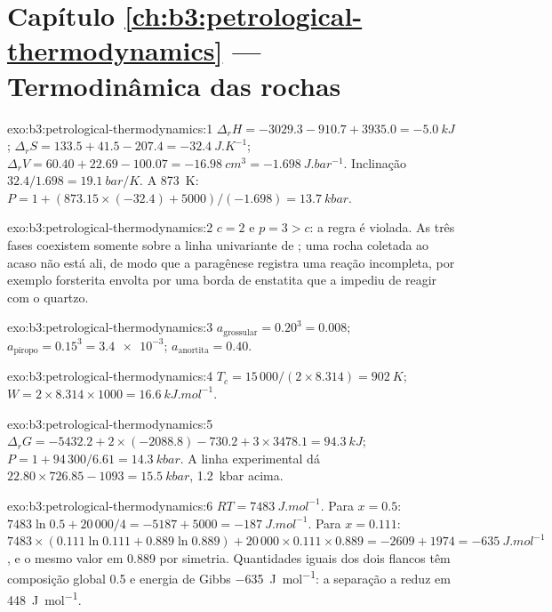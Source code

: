 \section*{Capítulo \ref{ch:b3:petrological-thermodynamics} --- Termodinâmica das rochas}

\begin{solution}{exo:b3:petrological-thermodynamics:1}
$\Delta_rH = -3029.3 - 910.7 + 3935.0 = \qty{-5.0}{kJ}$; $\Delta_rS = 133.5 +
41.5 - 207.4 = \qty{-32.4}{J.K^{-1}}$; $\Delta_rV = 60.40 + 22.69 - 100.07 =
\qty{-16.98}{cm^3} = \qty{-1.698}{J.bar^{-1}}$. Inclinação $32.4/1.698 =
\qty{19.1}{bar/K}$. A \qty{873}{K}: $P = 1 + (873.15\times(-32.4) +
5000)/(-1.698) = \qty{13.7}{kbar}$.
\end{solution}

\begin{solution}{exo:b3:petrological-thermodynamics:2}
$c = 2$ e $p = 3 > c$: a regra é violada. As três fases coexistem somente sobre a
linha univariante de ; uma rocha coletada ao
acaso não está ali, de modo que a paragênese registra uma reação incompleta,
por exemplo forsterita envolta por uma borda de enstatita que a impediu de
reagir com o quartzo.
\end{solution}

\begin{solution}{exo:b3:petrological-thermodynamics:3}
$a_{\text{grossular}} = 0.20^3 = 0.008$; $a_{\text{piropo}} = 0.15^3 =
\num{3.4e-3}$; $a_{\text{anortita}} = 0.40$.
\end{solution}

\begin{solution}{exo:b3:petrological-thermodynamics:4}
$T_c = 15\,000/(2\times8.314) = \qty{902}{K}$; $W = 2\times8.314\times1000
= \qty{16.6}{kJ.mol^{-1}}$.
\end{solution}

\begin{solution}{exo:b3:petrological-thermodynamics:5}
$\Delta_rG = -5432.2 + 2\times(-2088.8) - 730.2 + 3\times3478.1 =
\qty{94.3}{kJ}$; $P = 1 + 94\,300/6.61 = \qty{14.3}{kbar}$. A linha
experimental dá $22.80\times726.85 - 1093 = \qty{15.5}{kbar}$, \qty{1.2}{kbar}
acima.
\end{solution}

\begin{solution}{exo:b3:petrological-thermodynamics:6}
$RT = \qty{7483}{J.mol^{-1}}$. Para $x = 0.5$: $7483\ln0.5 + 20\,000/4 = -5187 +
5000 = \qty{-187}{J.mol^{-1}}$. Para $x = 0.111$: $7483\times(0.111\ln0.111 +
0.889\ln0.889) + 20\,000\times0.111\times0.889 = -2609 + 1974 =
\qty{-635}{J.mol^{-1}}$, e o mesmo valor em 0.889 por simetria. Quantidades iguais
dos dois flancos têm composição global 0.5 e energia de Gibbs
\qty{-635}{J.mol^{-1}}: a separação a reduz em \qty{448}{J.mol^{-1}}.
\end{solution}

